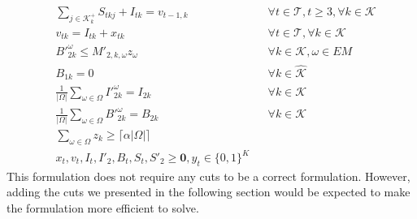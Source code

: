 \documentclass[11pt]{article}
\newcommand{\ti}{t} %
\newcommand{\TI}{\mathcal{T}}
\newcommand{\ka}{k} %
\newcommand{\KA}{\mathcal{K}}
\newcommand{\Ka}{K}
\newcommand{\jey}{j} %
\newcommand{\Bi}{B} %
\newcommand{\m}{\omega} %
\newcommand{\Em}{|\Omega|} %
\newcommand{\EM}{\Omega} %
\newcommand{\Csub}{\mathcal{K}^+_k}
\newcommand{\Psub}{\mathcal{K}^-_k}
\newcommand{\cred}{\color{black}}
\begin{document}
\begin{subequations}
\begin{alignat}{2}
&  \sum_{\jey \in  \Csub} {S}_{\ti \ka \jey} + I_{\ti \ka} = v_{\ti-1 , \ka} &&\forall \ti  \in \TI, \ti \geq 3,\forall \ka \in \KA       \label{eq:Det_inventory_ext}\\
& v_{\ti \ka} = I_{\ti \ka} + x_{\ti \ka}  \quad &&\forall \ti  \in \TI,\forall \ka \in \KA  \label{eq:Chance_OrderUpTo} \\
&B'^{\m}_{2 \ka} \leq M'_{2, \ka, \m} z_{\m} \quad && \forall \ka \in \KA, \m \in EM \\
&\Bi_{1 \ka} =0 &&\forall  \ka \in \hat{\KA} \label{eq:Backlog_determination_CC}\\
& \frac{1}{\Em} \sum_{\m \in \EM} I'^{\m}_{2 \ka } = I_{2 \ka} &&\forall \ka \in \KA  \label{eq:Average_Inventory} \\
& \frac{1}{\Em} \sum_{\m \in \EM} B'^{\m}_{2 \ka} = B_{2 \ka} &&\forall \ka \in \KA  \label{eq:Average_Backlog}\\
& \sum_ {\m \in \EM}  z_k \geq \lceil \alpha |\EM|  \rceil \label{eq:chance_ServiceLevel}\\
&{x}_{ \ti },  {v}_{ \ti },  {I}_{ \ti} , {I}'_{ 2} , {\Bi}_{ \ti } , {S}_{\ti}, {S}'_{2} \geq \mathbf{0} ,{y}_{ \ti } \in \{0,1\}^{\Ka} \label{eq:Sub_FD_bound3}
\end{alignat}
  \end{subequations}
  This  formulation does not require any cuts to be a correct formulation. However, adding the cuts we presented in the following section would be expected to make the formulation more efficient to solve.
\end{document}

